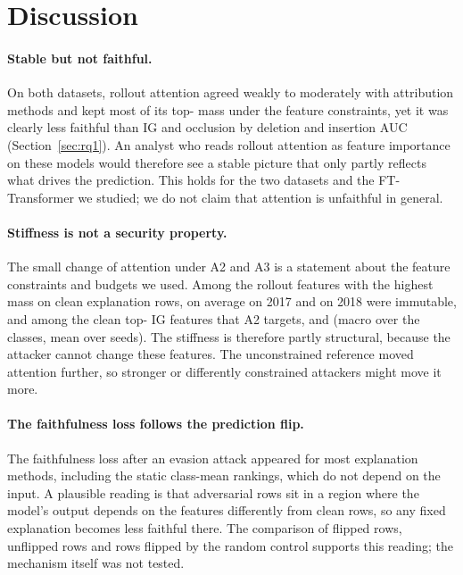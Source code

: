 \section{Discussion}
\label{sec:discussion}

\paragraph{Stable but not faithful.}
On both datasets, rollout attention agreed weakly to moderately with attribution methods and kept most of its
top-\paramTopK{} mass under the feature constraints, yet it was clearly less faithful than IG and occlusion by deletion
and insertion AUC (Section~\ref{sec:rq1}).
An analyst who reads rollout attention as feature importance on these models would therefore see a stable picture that
only partly reflects what drives the prediction.
This holds for the two datasets and the FT-Transformer we studied; we do not claim that attention is unfaithful in
general.

\paragraph{Stiffness is not a security property.}
The small change of attention under A2 and A3 is a statement about the feature constraints and budgets we used.
Among the \paramTopK{} rollout features with the highest mass on clean explanation rows, on average
\topImmRolloutSeventeen{} on 2017 and \topImmRolloutEighteen{} on 2018 were immutable, and among the clean
top-\paramTopK{} IG features that A2 targets, \topImmIGSeventeen{} and \topImmIGEighteen{} (macro over the
\nCommonClasses{} classes, mean over seeds).
The stiffness is therefore partly structural, because the attacker cannot change these features.
The unconstrained reference moved attention further, so stronger or differently constrained attackers might move it
more.

\paragraph{The faithfulness loss follows the prediction flip.}
The faithfulness loss after an evasion attack appeared for most explanation methods, including the static class-mean
rankings, which do not depend on the input.
A plausible reading is that adversarial rows sit in a region where the model's output depends on the features
differently from clean rows, so any fixed explanation becomes less faithful there.
The comparison of flipped rows, unflipped rows and rows flipped by the random control supports this reading; the
mechanism itself was not tested.

